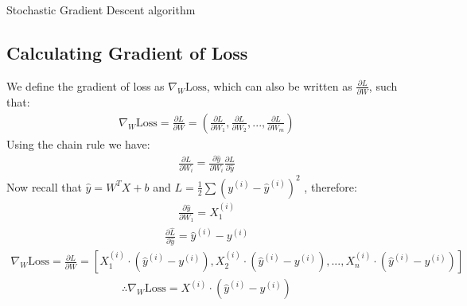 \documentclass[11pt]{article}
\numberwithin{equation}{section}
\theoremstyle{definition}%
\begin{document}
\begin{algorithm}
    \caption{Stochastic Gradient Descent algorithm}
    \begin{algorithmic}[1]
         
             
                 
                 
                   
                 
            \EndFor
        \EndFor
    \end{algorithmic}
\end{algorithm}

\subsection{Calculating Gradient of Loss}

We define the gradient of loss as $\nabla_W \text{Loss}$, which can also be written as $\frac{\partial L}{\partial W}$, such that: 
\begin{align}
    \nabla_W \text{Loss} = \frac{\partial L}{\partial W} = \left( \frac{\partial L}{\partial W_1}, \frac{\partial L}{\partial W_2}, ..., \frac{\partial L}{\partial W_m} \right)
\end{align}
Using the chain rule we have:
\begin{align}
    \frac{\partial L}{\partial W_i} = \frac{\partial \hat{y}}{\partial W_i} \frac{\partial L}{\partial \hat{y}}
\end{align}
Now recall that $\hat{y} = W^{T}X + b$ and $L = \frac{1}{2} \sum{(y^{(i)} - \hat{y}^{(i)})^{2}}$ , therefore:
\begin{align}
    \frac{\partial \hat{y}}{\partial W_1} = X_1^{(i)}
\end{align}
\begin{align}
    \frac{\partial \hat{L}}{\partial \hat{y}} = \hat{y}^{(i)} - y^{(i)}
\end{align}
\begin{align}
    \nabla_W \text{Loss} = \frac{\partial L}{\partial W} = \left[ X_1^{(i)} \cdot (\hat{y}^{(i)}-y^{(i)}), X_2^{(i)} \cdot (\hat{y}^{(i)}-y^{(i)}), ..., X_n^{(i)} \cdot (\hat{y}^{(i)}-y^{(i)}) \right]
\end{align}
\begin{align}
    \therefore \nabla_W \text{Loss} = X^{(i)} \cdot (\hat{y}^{(i)}-y^{(i)})
\end{align}
\end{document}
